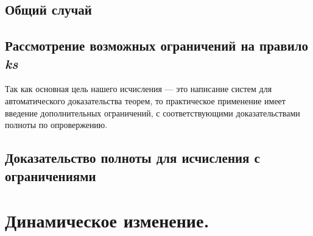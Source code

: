 \subsection{Общий случай}

\subsection{Рассмотрение возможных ограничений на правило \emph{ks}}
\label{sec:restr}

Так как основная цель нашего исчисления --- это написание систем для автоматического доказательства теорем, то практическое применение имеет введение дополнительных ограничений, с соответствующими доказательствами полноты по опровержению.



\subsection{Доказательство полноты для исчисления с ограничениями}

\section{Динамическое изменение.}
\label{sec:onlineChanging}